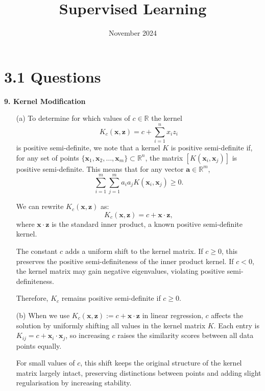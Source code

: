 \documentclass{article}
\title{Supervised Learning}
\date{November 2024}
\begin{document}
\maketitle

\section{3.1 Questions}

\vspace{0.5cm}
\noindent\textbf{9. Kernel Modification}
\vspace{0.5cm}

\begin{itemize}
    \item[(a)] To determine for which values of \( c \in \mathbb{R} \) the kernel 
    \[
    K_c(\mathbf{x}, \mathbf{z}) = c + \sum_{i=1}^n x_i z_i
    \]
    is positive semi-definite, we note that a kernel \( K \) is positive semi-definite if, for any set of points \( \{ \mathbf{x}_1, \mathbf{x}_2, \dots, \mathbf{x}_m \} \subset \mathbb{R}^n \), the matrix \( [K(\mathbf{x}_i, \mathbf{x}_j)] \) is positive semi-definite. This means that for any vector \( \mathbf{a} \in \mathbb{R}^m \),
    \[
    \sum_{i=1}^m \sum_{j=1}^m a_i a_j K(\mathbf{x}_i, \mathbf{x}_j) \geq 0.
    \]

    We can rewrite \( K_c(\mathbf{x}, \mathbf{z}) \) as:
    \[
    K_c(\mathbf{x}, \mathbf{z}) = c + \mathbf{x} \cdot \mathbf{z},
    \]
    where \( \mathbf{x} \cdot \mathbf{z} \) is the standard inner product, a known positive semi-definite kernel.

    The constant \( c \) adds a uniform shift to the kernel matrix. If \( c \geq 0 \), this preserves the positive semi-definiteness of the inner product kernel. If \( c < 0 \), the kernel matrix may gain negative eigenvalues, violating positive semi-definiteness.

    Therefore, \( K_c \) remains positive semi-definite if \( c \geq 0 \).

    \item[(b)] When we use \( K_c(\mathbf{x}, \mathbf{z}) := c + \mathbf{x} \cdot \mathbf{z} \) in linear regression, \( c \) affects the solution by uniformly shifting all values in the kernel matrix \( K \). Each entry is \( K_{ij} = c + \mathbf{x}_i \cdot \mathbf{x}_j \), so increasing \( c \) raises the similarity scores between all data points equally.

    For small values of \( c \), this shift keeps the original structure of the kernel matrix largely intact, preserving distinctions between points and adding slight regularisation by increasing stability. 


\end{itemize}
\end{document}
